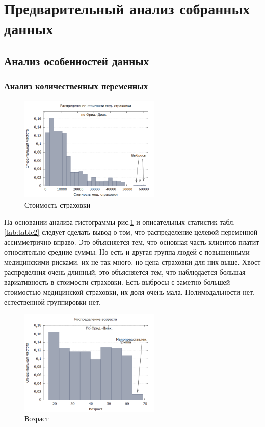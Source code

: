 \documentclass[a4paper,12pt]{article}
\begin{document}
\section{Предварительный анализ собранных данных}
\subsection{Анализ особенностей данных}
\subsubsection{Анализ количественных переменных}

\begin{figure}[H]
	\includegraphics[width=0.6\textwidth]{../[graphics]/charges.png}
	\centering
	\caption{Стоимость страховки}
	\label{fig:charges}
\end{figure}

На основании анализа гистограммы рис.\ref{fig:charges} и описательных статистик табл.\ref{tab:table2} следует сделать вывод о том, что распределение целевой переменной ассимметрично вправо. Это объясняется тем, что основная часть клиентов платит относительно средние суммы. Но есть и другая группа людей с повышенными медицинскими рисками, их не так много, но цена страховки для них выше. Хвост распределния очень длинный, это объясняется тем, что наблюдается большая вариативность в стоимости страховки. Есть выбросы с заметно большей стоимостью медицинской страховки, их доля очень мала. Полимодальности нет, естественной группировки нет.

\begin{figure}[H]
	\includegraphics[width=0.6\textwidth]{../[graphics]/age.png}
	\centering
	\caption{Возраст}
	\label{fig:age}
\end{figure}
\end{document}
